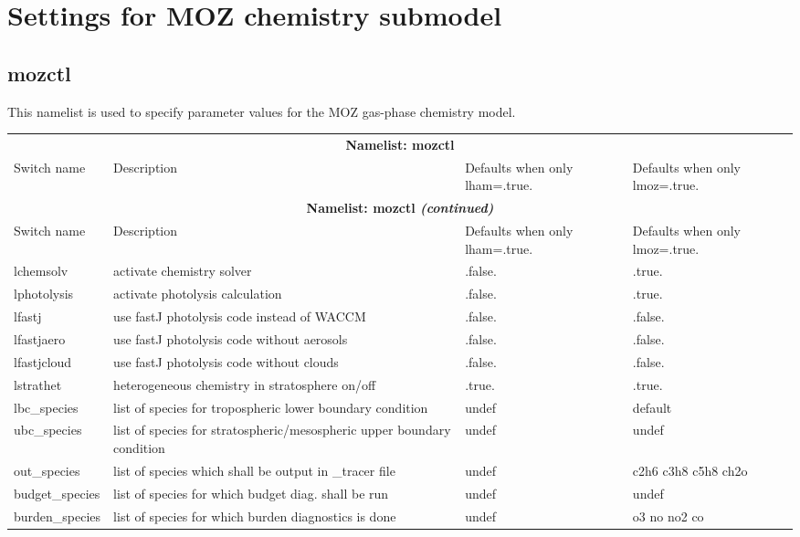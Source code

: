\documentclass[landscape, 11pt]{article}
\begin{document}
\section{Settings for MOZ chemistry submodel}
\subsection{mozctl} 
This namelist is used to specify parameter values for the MOZ gas-phase chemistry model.\\

\begin{longtable}{p{3.0cm}|p{7.5cm}|p{6.0cm}|p{6.0cm}}
\hline 
\multicolumn{4}{c}{\cellcolor{blue1} \bf Namelist: mozctl}\\ 
\cellcolor{blue2} Switch name & \cellcolor{blue2} Description& \cellcolor{blue2} Defaults when only lham=.true.& \cellcolor{blue2} Defaults when only lmoz=.true.\\ 
\hline \endfirsthead 
\multicolumn{4}{c}{\cellcolor{blue1} \bf Namelist: mozctl {\it (continued)}}\\ 
\cellcolor{blue2} Switch name & \cellcolor{blue2} Description& \cellcolor{blue2} Defaults when only lham=.true.& \cellcolor{blue2} Defaults when only lmoz=.true.\\ 
\hline \endhead 
lchemsolv & activate chemistry solver & .false. & .true. \\ 
lphotolysis & activate photolysis calculation & .false. & .true. \\ 
lfastj & use fastJ photolysis code instead of WACCM & .false. & .false. \\ 
lfastjaero & use fastJ photolysis code without aerosols & .false. & .false. \\ 
lfastjcloud & use fastJ photolysis code without clouds & .false. & .false. \\ 
lstrathet & heterogeneous chemistry in stratosphere on/off & .true. & .true. \\ 
lbc\_species & list of species for tropospheric lower boundary condition & undef & default \\ 
ubc\_species & list of species for stratospheric/mesospheric upper boundary condition & undef & undef \\ 
out\_species & list of species which shall be output in \_tracer file & undef & c2h6 c3h8 c5h8 ch2o \\ 
budget\_species & list of species for which budget diag. shall be run & undef & undef \\ 
burden\_species & list of species for which burden diagnostics is done & undef & o3 no no2 co \\ 

\end{longtable}
\end{document}

